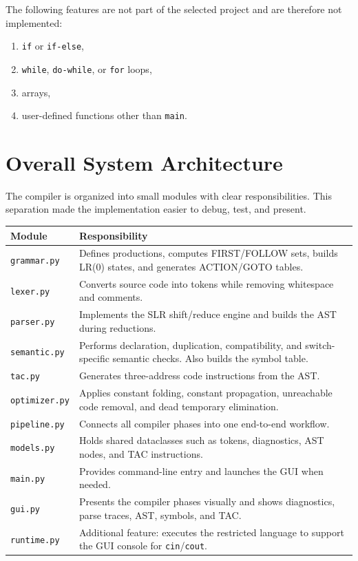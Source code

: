 \documentclass[12pt,a4paper]{article}
\begin{document}
The following features are not part of the selected project and are therefore not implemented:

\begin{enumerate}
    \item \texttt{if} or \texttt{if-else},
    \item \texttt{while}, \texttt{do-while}, or \texttt{for} loops,
    \item arrays,
    \item user-defined functions other than \texttt{main}.
\end{enumerate}

\section{Overall System Architecture}
The compiler is organized into small modules with clear responsibilities. This separation made the implementation easier to debug, test, and present.

\begin{center}
\begin{tabular}{|p{}|p{}|}
\hline
\textbf{Module} & \textbf{Responsibility} \\
\hline
\texttt{grammar.py} & Defines productions, computes FIRST/FOLLOW sets, builds LR(0) states, and generates ACTION/GOTO tables. \\
\hline
\texttt{lexer.py} & Converts source code into tokens while removing whitespace and comments. \\
\hline
\texttt{parser.py} & Implements the SLR shift/reduce engine and builds the AST during reductions. \\
\hline
\texttt{semantic.py} & Performs declaration, duplication, compatibility, and switch-specific semantic checks. Also builds the symbol table. \\
\hline
\texttt{tac.py} & Generates three-address code instructions from the AST. \\
\hline
\texttt{optimizer.py} & Applies constant folding, constant propagation, unreachable code removal, and dead temporary elimination. \\
\hline
\texttt{pipeline.py} & Connects all compiler phases into one end-to-end workflow. \\
\hline
\texttt{models.py} & Holds shared dataclasses such as tokens, diagnostics, AST nodes, and TAC instructions. \\
\hline
\texttt{main.py} & Provides command-line entry and launches the GUI when needed. \\
\hline
\texttt{gui.py} & Presents the compiler phases visually and shows diagnostics, parse traces, AST, symbols, and TAC. \\
\hline
\texttt{runtime.py} & Additional feature: executes the restricted language to support the GUI console for \texttt{cin}/\texttt{cout}. \\
\hline
\end{tabular}
\end{center}
\end{document}
